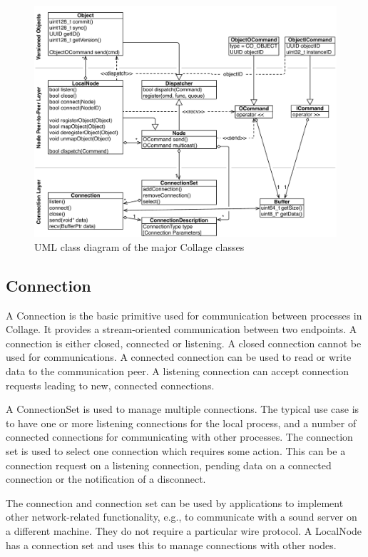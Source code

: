 \begin{figure}[h!t]\center
  \includegraphics[width=\textwidth]{images/collageUML}
  {\caption{\label{fCollageUML}UML class diagram of the major Collage classes}}
\end{figure}

\subsection{Connection}

A \textsf{Connection} is the basic primitive used for communication between
processes in Collage. It provides a stream-oriented communication between two
endpoints. A connection is either closed, connected or listening. A closed
connection cannot be used for communications. A connected connection can be
used to read or write data to the communication peer. A listening connection
can accept connection requests leading to new, connected connections.

A \textsf{ConnectionSet} is used to manage multiple connections. The typical use
case is to have one or more listening connections for the local process, and a
number of connected connections for communicating with other processes.
The connection set is used to select one connection which requires some action.
This can be a connection request on a listening connection, pending data on a
connected connection or the notification of a disconnect.

The connection and connection set can be used by applications to implement
other network-related functionality, e.g., to communicate with a sound server
on a different machine. They do not require a particular wire protocol. A
\textsf{LocalNode} has a connection set and uses this to manage connections
with other nodes.

